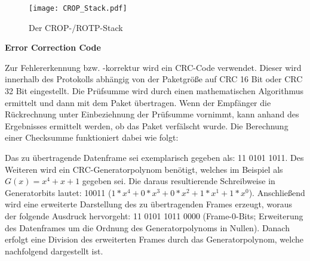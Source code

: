 \begin{figure}[H]
	\centering
	\texttt{[image: CROP\_Stack.pdf]}
	\caption{Der CROP-/ROTP-Stack}
	\label{fig:CROP_Stack}
\end{figure}

\textbf{Error Correction Code}

Zur Fehlererkennung bzw. -korrektur wird ein CRC-Code verwendet. Dieser wird
innerhalb des Protokolls abhängig von der Paketgr{\"o}{\ss}e auf CRC 16 Bit oder
CRC 32 Bit eingestellt. Die Pr{\"u}fsumme wird durch einen mathematischen
Algorithmus ermittelt und dann mit dem Paket {\"u}bertragen. Wenn der
Empf{\"a}nger die R{\"u}ckrechnung unter Einbeziehnung der Pr{\"u}fsumme
vornimmt, kann anhand des Ergebnisses ermittelt werden, ob das Paket
verf{\"a}lscht wurde. Die Berechnung einer Checksumme funktioniert dabei wie
folgt:

Das zu {\"u}bertragende Datenframe sei exemplarisch gegeben als: 11 0101 1011.
Des Weiteren wird ein CRC-Generatorpolynom ben{\"o}tigt, welches im Beispiel als
$G(x) = x^4 + x + 1$ gegeben sei. Die daraus resultierende Schreibweise in Generatorbits lautet: 10011
($1*x^4+0*x^3+0*x^2+1*x^1+1*x^0$).
Anschließend wird eine erweiterte Darstellung des zu {\"u}bertragenden Frames
erzeugt, woraus der folgende Ausdruck hervorgeht: 11 0101 1011 0000
(Frame-0-Bits; Erweiterung des Datenframes um die Ordnung des Generatorpolynoms
in Nullen). Danach erfolgt eine Division des erweiterten Frames durch das
Generatorpolynom, welche nachfolgend dargestellt ist.

\makeatletter
\def\cline#1{\noalign{\vskip-2ex}\@cline#1\@nil}
\makeatother

